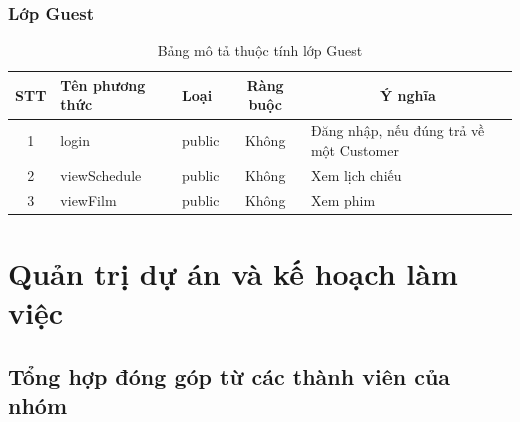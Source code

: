 \documentclass[a4paper, 12pt]{article}
\begin{document}
\subsubsection{Lớp Guest}

\begin{table}[H]
	\begin{center}
		\begin{tabular}{|c|l|l|c|l|}
		\hline
		STT & Tên phương thức & Loại   & Ràng buộc & \multicolumn{1}{c|}{Ý nghĩa}                                 \\ \hline
		1   & login           & public &   Không        & Đăng nhập, nếu đúng trả về một Customer \\ \hline
		2   & viewSchedule    & public &   Không        & Xem lịch chiếu                          \\ \hline
		3   & viewFilm        & public &   Không        & Xem phim                                \\ \hline
		\end{tabular}
		\caption{Bảng mô tả thuộc tính lớp Guest}
	\end{center}
\end{table}

\clearpage

\section{Quản trị dự án và kế hoạch làm việc}

\subsection{Tổng hợp đóng góp từ các thành viên của nhóm}
\end{document}
